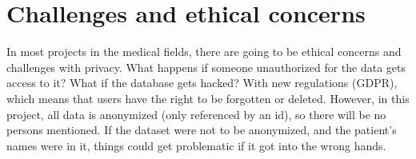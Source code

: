 \section{Challenges and ethical concerns}
In most projects in the medical fields, there are going to be ethical concerns and challenges with privacy. What happens if someone unauthorized for the data gets access to it? What if the database gets hacked? With new regulations (GDPR), which means that users have the right to be forgotten or deleted. However, in this project, all data is anonymized (only referenced by an id), so there will be no persons mentioned. If the dataset were not to be anonymized, and the patient's names were in it, things could get problematic if it got into the wrong hands. 
